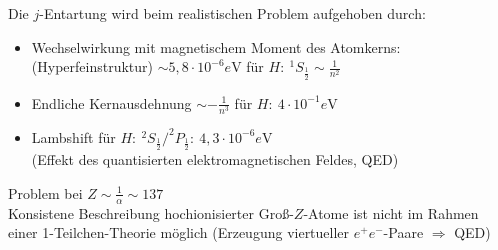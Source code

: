 Die $j$-Entartung wird beim realistischen Problem aufgehoben durch:
	\begin{itemize}
		\item Wechselwirkung mit magnetischem Moment des Atomkerns: \\
			(Hyperfeinstruktur)
			$\sim 5,8 \cdot 10^{-6} e$V für $ H:~ ^1S_{\frac{1}{2}} \sim \frac{1}{n^2}$ 
		\item Endliche Kernausdehnung 
			$\sim -\frac{1}{n^3} $ für $ H:~ 4\cdot 10^{-1} e$V
		\item Lambshift für $H:~ ^2S_{\frac{1}{2}} / ^2P_{\frac{1}{2}}: ~ 
		4,3 \cdot 10^{-6} e$V \\
			(Effekt des quantisierten elektromagnetischen Feldes, QED)
	\end{itemize}
Problem bei $Z\sim \frac{1}{\alpha} \sim 137$
\\
Konsistene Beschreibung hochionisierter Groß-$Z$-Atome ist nicht im Rahmen einer 1-Teilchen-Theorie möglich (Erzeugung viertueller $e^+e^-$-Paare $\Rightarrow$ QED)